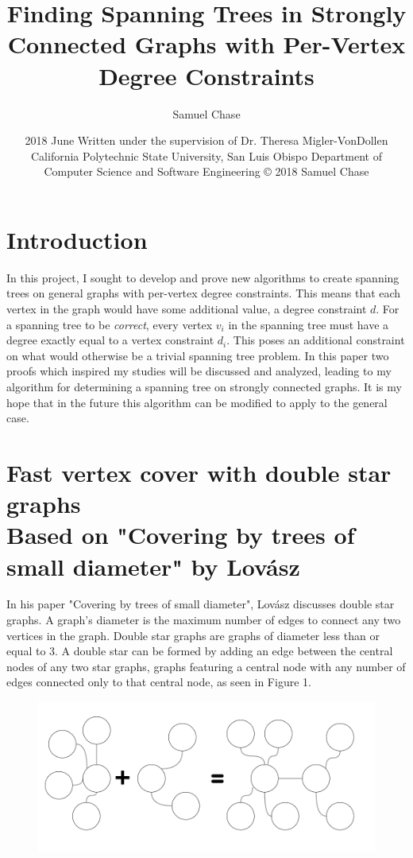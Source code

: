 \documentclass{article}
\title{Finding Spanning Trees in Strongly Connected Graphs with Per-Vertex Degree Constraints}
\author{Samuel Chase}
\date{2018 June \linebreak\linebreak
	\small{Written under the supervision of Dr. Theresa Migler-VonDollen\linebreak\linebreak
	California Polytechnic State University, San Luis Obispo \linebreak\linebreak
	Department of Computer Science and Software Engineering \linebreak\linebreak
	© 2018 Samuel Chase}}
\begin{document}
	\maketitle
	
	\tableofcontents
	\newpage
	\section{Introduction}
	In this project, I sought to develop and prove new algorithms to create spanning trees on general graphs with per-vertex degree constraints. 
	This means that each vertex in the graph would have some additional value, a degree constraint $d$. For a spanning tree to be \textit{correct}, every vertex $v_{i}$ in the spanning tree must have a degree exactly equal to a vertex constraint $d_{i}$. This poses an additional constraint on what
	would otherwise be a trivial spanning tree problem. In this paper two proofs which inspired my studies will be discussed and analyzed, leading to my algorithm for determining a spanning tree on strongly connected graphs. It is my hope that in the future this algorithm can be modified to apply to the general case.
	
	
	
	\section{Fast vertex cover with double star graphs \\ {\small Based on "Covering by trees of small diameter" by Lov\'asz \cite{1}} }
	In his paper "Covering by trees of small diameter", Lov\'asz discusses double star graphs. A graph's diameter is the maximum number of edges to connect any two vertices in the graph. Double star graphs are graphs of diameter less than or equal to 3. A double star can be formed by adding an edge between the central nodes of any two star graphs, graphs featuring a central node with any number of edges connected only to that central node, as seen in Figure 1.
	\begin{figure}[H]
		\caption{}
		\includegraphics{Figure1}
	\end{figure}
	
\end{document}
